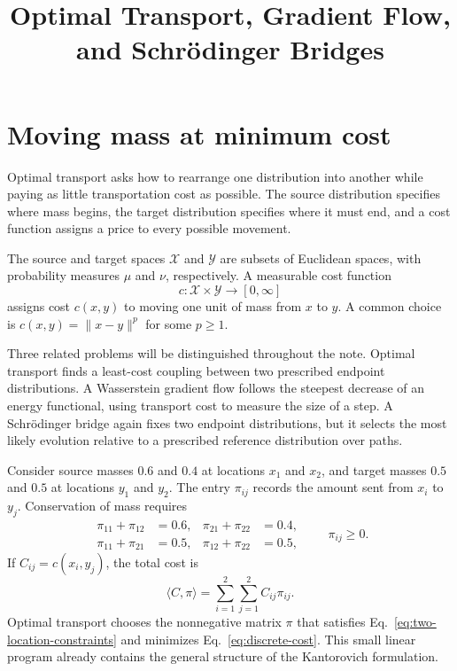 \documentclass[11pt]{article}
\title{Optimal Transport, Gradient Flow, and Schr\"odinger Bridges}
\author{}
\date{}
\begin{document}
\maketitle
\tableofcontents

\section{Moving mass at minimum cost}

Optimal transport asks how to rearrange one distribution into another while
paying as little transportation cost as possible. The source distribution
specifies where mass begins, the target distribution specifies where it must
end, and a cost function assigns a price to every possible movement.

The source and target spaces $\mathcal X$ and $\mathcal Y$ are subsets of
Euclidean spaces, with probability measures $\mu$ and $\nu$, respectively.
A measurable cost function
\begin{equation}
  c:\mathcal X\times\mathcal Y\to[0,\infty]
\end{equation}
assigns cost $c(x,y)$ to moving one unit of mass from $x$ to $y$. A common
choice is $c(x,y)=\lVert x-y\rVert^p$ for some $p\geq 1$.

Three related problems will be distinguished throughout the note. Optimal
transport finds a least-cost coupling between two prescribed endpoint
distributions. A Wasserstein gradient flow follows the steepest decrease of
an energy functional, using transport cost to measure the size of a step.
A Schr\"odinger bridge again fixes two endpoint distributions, but it selects
the most likely evolution relative to a prescribed reference distribution
over paths.

Consider source masses $0.6$ and $0.4$ at locations $x_1$ and $x_2$, and
target masses $0.5$ and $0.5$ at locations $y_1$ and $y_2$. The entry
$\pi_{ij}$ records the amount sent from $x_i$ to $y_j$. Conservation of mass
requires
\begin{equation}
  \begin{aligned}
    \pi_{11}+\pi_{12}&=0.6,
    &\pi_{21}+\pi_{22}&=0.4,\\
    \pi_{11}+\pi_{21}&=0.5,
    &\pi_{12}+\pi_{22}&=0.5,
  \end{aligned}
  \qquad \pi_{ij}\geq 0.
  \label{eq:two-location-constraints}
\end{equation}
If $C_{ij}=c(x_i,y_j)$, the total cost is
\begin{equation}
  \langle C,\pi\rangle
  =\sum_{i=1}^{2}\sum_{j=1}^{2}C_{ij}\pi_{ij}.
  \label{eq:discrete-cost}
\end{equation}
Optimal transport chooses the nonnegative matrix $\pi$ that satisfies
Eq.~\eqref{eq:two-location-constraints} and minimizes
Eq.~\eqref{eq:discrete-cost}. This small linear program already contains the
general structure of the Kantorovich formulation.
\end{document}
